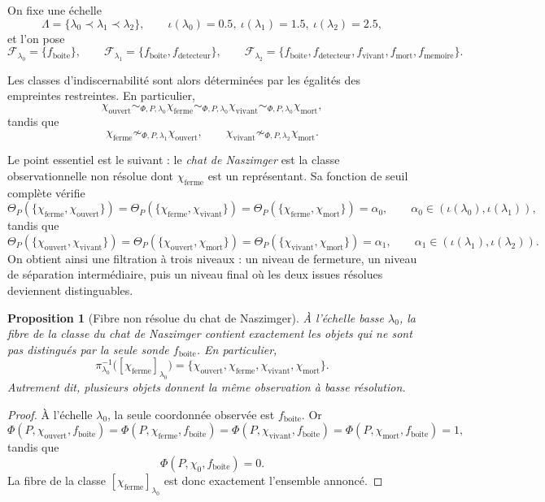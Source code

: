 \documentclass[11pt,a4paper,openany]{book}
\newtheorem{proposition}[definition]{Proposition}
\begin{document}
On fixe une échelle
\[
\Lambda=\{\lambda_0\prec\lambda_1\prec\lambda_2\},
\qquad
\iota(\lambda_0)=0.5,\ \iota(\lambda_1)=1.5,\ \iota(\lambda_2)=2.5,
\]
et l'on pose
\[
\mathcal F_{\lambda_0}=\{f_{\mathrm{boite}}\},\qquad
\mathcal F_{\lambda_1}=\{f_{\mathrm{boite}},f_{\mathrm{detecteur}}\},\qquad
\mathcal F_{\lambda_2}=\{f_{\mathrm{boite}},f_{\mathrm{detecteur}},f_{\mathrm{vivant}},f_{\mathrm{mort}},f_{\mathrm{memoire}}\}.
\]

Les classes d'indiscernabilité sont alors déterminées par les égalités des empreintes restreintes. En particulier,
\[
\chi_{\mathrm{ouvert}} \sim_{\Phi,P,\lambda_0} \chi_{\mathrm{ferme}}
\sim_{\Phi,P,\lambda_0} \chi_{\mathrm{vivant}}
\sim_{\Phi,P,\lambda_0} \chi_{\mathrm{mort}},
\]
tandis que
\[
\chi_{\mathrm{ferme}} \not\sim_{\Phi,P,\lambda_1} \chi_{\mathrm{ouvert}},
\qquad
\chi_{\mathrm{vivant}} \not\sim_{\Phi,P,\lambda_2} \chi_{\mathrm{mort}}.
\]

Le point essentiel est le suivant : le \emph{chat de Naszimger} est la classe observationnelle non résolue dont \(\chi_{\mathrm{ferme}}\) est un représentant. Sa fonction de seuil complète vérifie
\[
\Theta_P(\{\chi_{\mathrm{ferme}},\chi_{\mathrm{ouvert}}\})=
\Theta_P(\{\chi_{\mathrm{ferme}},\chi_{\mathrm{vivant}}\})=
\Theta_P(\{\chi_{\mathrm{ferme}},\chi_{\mathrm{mort}}\})
=\alpha_0,
\qquad
\alpha_0\in(\iota(\lambda_0),\iota(\lambda_1)),
\]
tandis que
\[
\Theta_P(\{\chi_{\mathrm{ouvert}},\chi_{\mathrm{vivant}}\})
=
\Theta_P(\{\chi_{\mathrm{ouvert}},\chi_{\mathrm{mort}}\})
=
\Theta_P(\{\chi_{\mathrm{vivant}},\chi_{\mathrm{mort}}\})
=\alpha_1,
\qquad
\alpha_1\in(\iota(\lambda_1),\iota(\lambda_2)).
\]
On obtient ainsi une filtration à trois niveaux : un niveau de fermeture, un niveau de séparation intermédiaire, puis un niveau final où les deux issues résolues deviennent distinguables.

\begin{proposition}[Fibre non résolue du chat de Naszimger]
À l'échelle basse \(\lambda_0\), la fibre de la classe du chat de Naszimger contient exactement les objets qui ne sont pas distingués par la seule sonde \(f_{\mathrm{boite}}\). En particulier,
\[
\pi_{\lambda_0}^{-1}\bigl([\chi_{\mathrm{ferme}}]_{\lambda_0}\bigr)
=
\{\chi_{\mathrm{ouvert}},\chi_{\mathrm{ferme}},\chi_{\mathrm{vivant}},\chi_{\mathrm{mort}}\}.
\]
Autrement dit, plusieurs objets donnent la même observation à basse résolution.
\end{proposition}

\begin{proof}
À l'échelle \(\lambda_0\), la seule coordonnée observée est \(f_{\mathrm{boite}}\). Or
\[
\Phi(P,\chi_{\mathrm{ouvert}},f_{\mathrm{boite}})
=
\Phi(P,\chi_{\mathrm{ferme}},f_{\mathrm{boite}})
=
\Phi(P,\chi_{\mathrm{vivant}},f_{\mathrm{boite}})
=
\Phi(P,\chi_{\mathrm{mort}},f_{\mathrm{boite}})
=1,
\]
tandis que
\[
\Phi(P,\chi_0,f_{\mathrm{boite}})=0.
\]
La fibre de la classe \([\chi_{\mathrm{ferme}}]_{\lambda_0}\) est donc exactement l'ensemble annoncé.
\end{proof}
\end{document}
